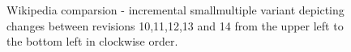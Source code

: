 \begin{figure}[tb]
\caption{\label{fig:wikipedia-smallmultiple-incremental} Wikipedia comparsion - incremental smallmultiple variant depicting changes between revisions 10,11,12,13 and 14 from the upper left to the bottom left in clockwise order.}
\end{figure}



